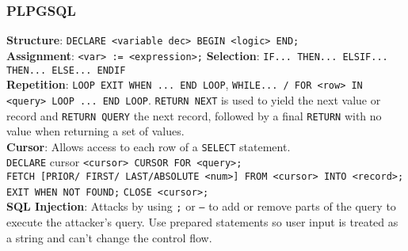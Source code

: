 \begin{multicols*}{3}
\subsubsection{PLPGSQL}
\textbf{Structure}: \texttt{DECLARE <variable dec> BEGIN <logic> END;} \\
\textbf{Assignment}: \texttt{<var> := <expression>;}
\textbf{Selection}: \texttt{IF... THEN... ELSIF... THEN... ELSE... ENDIF}\\
\textbf{Repetition}: \texttt{LOOP EXIT WHEN ... END LOOP}, \texttt{WHILE... / FOR <row> IN <query> LOOP ... END LOOP}. \texttt{RETURN NEXT} is used to yield the next value or record and \texttt{RETURN QUERY} the next record, followed by a final \texttt{RETURN} with no value when returning a set of values.\\
\textbf{Cursor}: Allows access to each row of a \texttt{SELECT} statement.\\
\texttt{DECLARE} cursor \texttt{<cursor> CURSOR FOR <query>;}\\
\texttt{FETCH [PRIOR/ FIRST/ LAST/ABSOLUTE <num>] FROM <cursor> INTO <record>;}\\
\texttt{EXIT WHEN NOT FOUND;} \texttt{CLOSE <cursor>;}\\

\noindent\textbf{SQL Injection}: Attacks by using \texttt{;} or \texttt{--} to add or remove parts of the query to execute the attacker's query. Use prepared statements so user input is treated as a string and can't change the control flow.\\


\end{multicols*}

